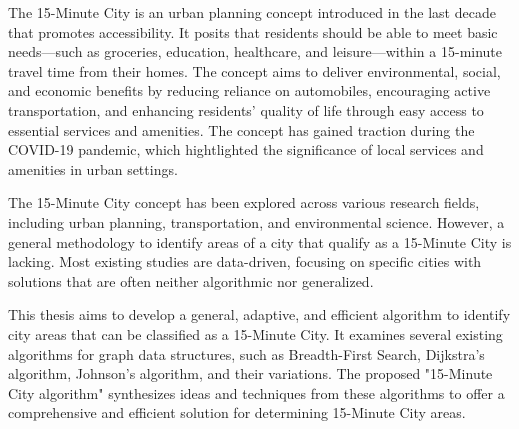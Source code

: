 \begin{Abstract}
\begin{changemargin}{1cm}{1cm}

The 15-Minute City is an urban planning concept introduced in the last decade that promotes accessibility. It posits that residents should be able to meet basic needs—such as groceries, education, healthcare, and leisure—within a 15-minute travel time from their homes. The concept aims to deliver environmental, social, and economic benefits by reducing reliance on automobiles, encouraging active transportation, and enhancing residents' quality of life through easy access to essential services and amenities. The concept has gained traction during the COVID-19 pandemic, which hightlighted the significance of local services and amenities in urban settings.

\vspace{0.5cm}

The 15-Minute City concept has been explored across various research fields, including urban planning, transportation, and environmental science. However, a general methodology to identify areas of a city that qualify as a 15-Minute City is lacking. Most existing studies are data-driven, focusing on specific cities with solutions that are often neither algorithmic nor generalized.

\vspace{0.5cm}

This thesis aims to develop a general, adaptive, and efficient algorithm to identify city areas that can be classified as a 15-Minute City. It examines several existing algorithms for graph data structures, such as Breadth-First Search, Dijkstra's algorithm, Johnson's algorithm, and their variations. The proposed "15-Minute City algorithm" synthesizes ideas and techniques from these algorithms to offer a comprehensive and efficient solution for determining 15-Minute City areas.

\end{changemargin}
\end{Abstract}